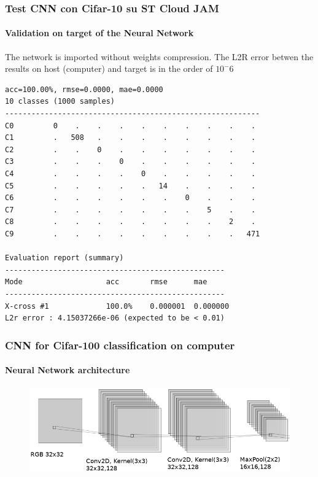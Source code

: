 \documentclass{beamer}
\begin{document}
\begin{frame}[fragile]
\frametitle{Test CNN con Cifar-10 su ST Cloud JAM}
\framesubtitle{Validation on target of the Neural Network}
\small{The network is imported without weights compression. The L2R error betwen the results on host (computer) and target is in the order of \(10^-6\)}
\begin{lstlisting}
acc=100.00%, rmse=0.0000, mae=0.0000
10 classes (1000 samples)
----------------------------------------------------------
C0         0    .    .    .    .    .    .    .    .    .  
C1         .   508   .    .    .    .    .    .    .    .  
C2         .    .    0    .    .    .    .    .    .    .  
C3         .    .    .    0    .    .    .    .    .    .  
C4         .    .    .    .    0    .    .    .    .    .  
C5         .    .    .    .    .   14    .    .    .    .  
C6         .    .    .    .    .    .    0    .    .    .  
C7         .    .    .    .    .    .    .    5    .    .  
C8         .    .    .    .    .    .    .    .    2    .  
C9         .    .    .    .    .    .    .    .    .   471 

Evaluation report (summary)
--------------------------------------------------
Mode                   acc       rmse      mae      
--------------------------------------------------
X-cross #1             100.0%    0.000001  0.000000 
L2r error : 4.15037266e-06 (expected to be < 0.01)
\end{lstlisting}
\end{frame}

\begin{frame}
\frametitle{CNN for Cifar-100 classification on computer}
\framesubtitle{Neural Network architecture}
\begin{figure}
	\centering
	\includegraphics[scale=0.4]{pictures/Cifar_100/cnn1}
\end{figure}
\end{frame}
\end{document}
